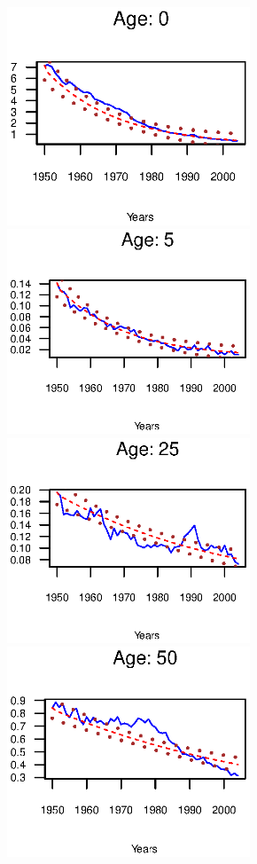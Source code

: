 \documentclass[smallextended]{svjour3}
\begin{document}
\begin{figure}[H]
    \includegraphics[width = 2.85in]{PlotMen0.eps}
    \includegraphics[width = 2.85in]{PlotMen5.eps}
    \includegraphics[width = 2.85in]{PlotMen25.eps}
    \includegraphics[width = 2.85in]{PlotMen50.eps}

\end{figure}
\end{document}
